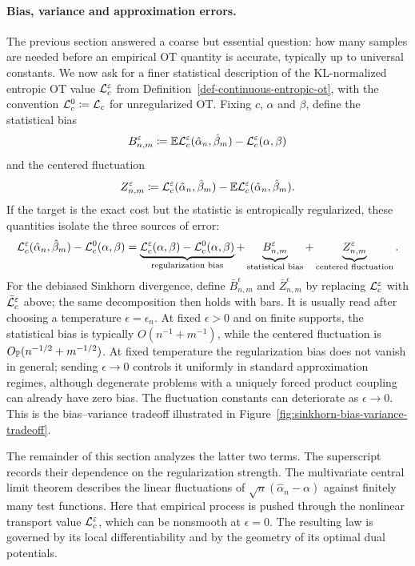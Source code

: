 \paragraph{Bias, variance and approximation errors.}
The previous section answered a coarse but essential question: how many samples are needed before an empirical OT quantity is accurate, typically up to universal constants. We now ask for a finer statistical description of the KL-normalized entropic OT value \(\mathcal{L}_c^\varepsilon\) from Definition~\ref{def-continuous-entropic-ot}, with the convention
\(\mathcal{L}_c^0\coloneqq\mathcal{L}_c\) for unregularized OT\@. Fixing \(c\), \(\alpha\) and \(\beta\), define the statistical bias
\[
	B_{n,m}^\varepsilon
	\coloneqq
	\mathbb{E} \mathcal{L}_c^\varepsilon(\hat\alpha_n,\hat\beta_m)
	-\mathcal{L}_c^\varepsilon(\alpha,\beta)
\]
and the centered fluctuation
\[
	Z_{n,m}^\varepsilon
	\coloneqq
	\mathcal{L}_c^\varepsilon(\hat\alpha_n,\hat\beta_m)
	-\mathbb{E} \mathcal{L}_c^\varepsilon(\hat\alpha_n,\hat\beta_m).
\]
If the target is the exact cost but the statistic is entropically regularized, these quantities isolate the three sources of error:
\[
	\mathcal{L}_c^\varepsilon(\hat\alpha_n,\hat\beta_m)-\mathcal{L}_c^0(\alpha,\beta)
	=
	\underbrace{\mathcal{L}_c^\varepsilon(\alpha,\beta)-\mathcal{L}_c^0(\alpha,\beta)}_{\text{regularization bias}}
	+
	\underbrace{B_{n,m}^\varepsilon}_{\text{statistical bias}}
	+
	\underbrace{Z_{n,m}^\varepsilon}_{\text{centered fluctuation}}.
\]
For the debiased Sinkhorn divergence, define \(\bar B_{n,m}^\epsilon\) and \(\bar Z_{n,m}^\epsilon\) by replacing \(\mathcal{L}_c^\varepsilon\) with \(\bar{\mathcal{L}}_c^\varepsilon\) above; the same decomposition then holds with bars. It is usually read after choosing a temperature \(\epsilon=\epsilon_n\). At fixed \(\epsilon>0\) and on finite supports, the statistical bias is typically \(O(n^{-1}+m^{-1})\), while the centered fluctuation is \(O_{\mathbb{P}}(n^{-1/2}+m^{-1/2})\). At fixed temperature the regularization bias does not vanish in general; sending \(\epsilon\to0\) controls it uniformly in standard approximation regimes, although degenerate problems with a uniquely forced product coupling can already have zero bias. The fluctuation constants can deteriorate as \(\epsilon\to0\). This is the bias--variance tradeoff illustrated in Figure~\ref{fig:sinkhorn-bias-variance-tradeoff}.

The remainder of this section analyzes the latter two terms. The superscript records their dependence on the regularization strength. The multivariate central limit theorem describes the linear fluctuations of \(\sqrt n(\hat\alpha_n-\alpha)\) against finitely many test functions. Here that empirical process is pushed through the nonlinear transport value \(\mathcal{L}_c^\varepsilon\), which can be nonsmooth at \(\epsilon=0\). The resulting law is governed by its local differentiability and by the geometry of its optimal dual potentials.

